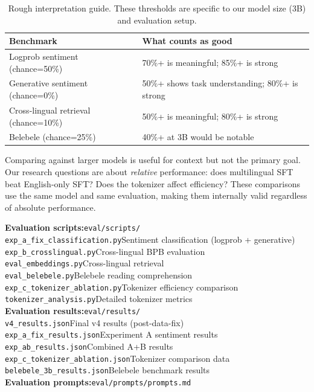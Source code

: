 \documentclass[11pt,a4paper]{article}
\begin{document}
\begin{table}[H]
\centering
\begin{tabular}{ll}
\toprule
\textbf{Benchmark} & \textbf{What counts as good} \\
\midrule
Logprob sentiment (chance=50\%) & 70\%+ is meaningful; 85\%+ is strong \\
Generative sentiment (chance=0\%) & 50\%+ shows task understanding; 80\%+ is strong \\
Cross-lingual retrieval (chance=10\%) & 50\%+ is meaningful; 80\%+ is strong \\
Belebele (chance=25\%) & 40\%+ at 3B would be notable \\
\bottomrule
\end{tabular}
\caption{Rough interpretation guide. These thresholds are specific to our model size (3B) and evaluation setup.}
\label{tab:interpretation}
\end{table}

Comparing against larger models is useful for context but not the primary goal. Our research questions are about \emph{relative} performance: does multilingual SFT beat English-only SFT? Does the tokenizer affect efficiency? These comparisons use the same model and same evaluation, making them internally valid regardless of absolute performance.

\begin{reporef}
\textbf{Evaluation scripts:}\hfill\texttt{eval/scripts/}\\
\quad\texttt{exp\_a\_fix\_classification.py}\hfill Sentiment classification (logprob + generative)\\
\quad\texttt{exp\_b\_crosslingual.py}\hfill Cross-lingual BPB evaluation\\
\quad\texttt{eval\_embeddings.py}\hfill Cross-lingual retrieval\\
\quad\texttt{eval\_belebele.py}\hfill Belebele reading comprehension\\
\quad\texttt{exp\_c\_tokenizer\_ablation.py}\hfill Tokenizer efficiency comparison\\
\quad\texttt{tokenizer\_analysis.py}\hfill Detailed tokenizer metrics\\
[4pt]
\textbf{Evaluation results:}\hfill\texttt{eval/results/}\\
\quad\texttt{v4\_results.json}\hfill Final v4 results (post-data-fix)\\
\quad\texttt{exp\_a\_fix\_results.json}\hfill Experiment A sentiment results\\
\quad\texttt{exp\_ab\_results.json}\hfill Combined A+B results\\
\quad\texttt{exp\_c\_tokenizer\_ablation.json}\hfill Tokenizer comparison data\\
\quad\texttt{belebele\_3b\_results.json}\hfill Belebele benchmark results\\
[4pt]
\textbf{Evaluation prompts:}\hfill\texttt{eval/prompts/prompts.md}\\
\end{reporef}
\end{document}
